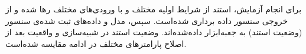 %
%

برای انجام آزمایش، استند از شرایط اولیه مختلف و با ورودی‌های مختلف رها شده و از خروجی سنسور داده برداری شده‌است. سپس، مدل و داده‌های ثبت شده‌ی سنسور (وضعیت استند) به جعبه‌ابزار
 داده‌شده‌اند. 
وضعیت استند در شبیه‌سازی و واقعیت بعد از اصلاح پارامترهای مختلف
در ادامه مقایسه شده‌است.











